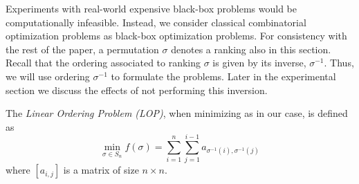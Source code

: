 \documentclass[sigconf,dvipsnames]{acmart}
\newcommand{\FEmax}{\ensuremath{m}}
\begin{document}




%
Experiments with real-world expensive black-box problems would be computationally infeasible. Instead, we consider classical combinatorial optimization problems as black-box optimization problems. For consistency with the rest of the paper, a permutation $\sigma$ denotes a ranking also in this section. Recall that the ordering associated to ranking $\sigma$ is given by its inverse, $\sigma^{-1}$. Thus, we will use ordering $\sigma^{-1}$ to formulate the problems. Later in the experimental section we discuss the effects of not performing this inversion.

The \emph{Linear Ordering Problem (LOP)}, when minimizing as in our case, is defined as
\begin{equation}\label{eq:lop}
  \min_{\sigma \in S_n} f(\sigma) = \sum_{i=1}^{n} \sum_{j=1}^{i-1}  a_{\sigma^{-1}(i), \sigma^{-1}(j)}
\end{equation}
%
where $[a_{i,j}]$ is a matrix of size $n \times n$.

\end{document}
